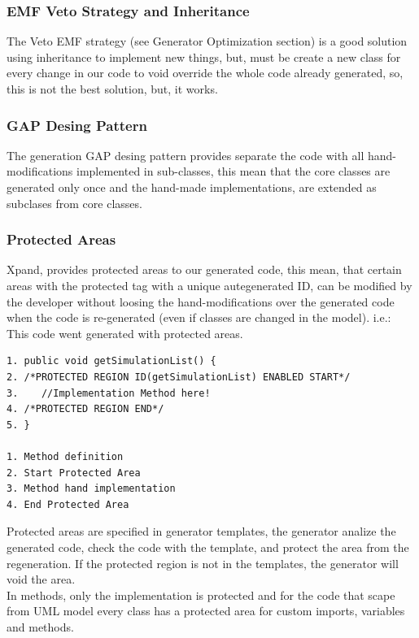\subsubsection{EMF Veto Strategy and Inheritance}
The Veto EMF strategy (see Generator Optimization section) is a good solution
using inheritance to implement new things, but, must be create a new class for every change in our code to void
override the whole code already generated, so, this is not the best solution,
but, it works.

\subsubsection{GAP Desing Pattern}
The generation GAP desing pattern provides separate the code with all
hand-modifications implemented in sub-classes, this mean that the core classes
are generated only once and the hand-made implementations, are extended as
subclases from core classes.

\subsubsection{Protected Areas}
Xpand, provides protected areas to our generated code, this mean, that certain
areas with the protected tag with a unique autegenerated ID, can be modified by
the developer without loosing the hand-modifications over the generated code
when the code is re-generated (even if classes are changed in the model).
i.e.: This code went generated with protected areas.
\begin{verbatim}
1. public void getSimulationList() {
2. /*PROTECTED REGION ID(getSimulationList) ENABLED START*/
3.    //Implementation Method here!
4. /*PROTECTED REGION END*/
5. }

1. Method definition
2. Start Protected Area
3. Method hand implementation
4. End Protected Area
\end{verbatim}
Protected areas are specified in generator templates, the generator analize the
generated code, check the code with the template, and protect the area from the
regeneration. If the protected region is not in the templates, the generator
will void the area.\\
In methods, only the implementation is protected and for the code that scape
from UML model every class has a protected area for custom imports, variables and methods.
